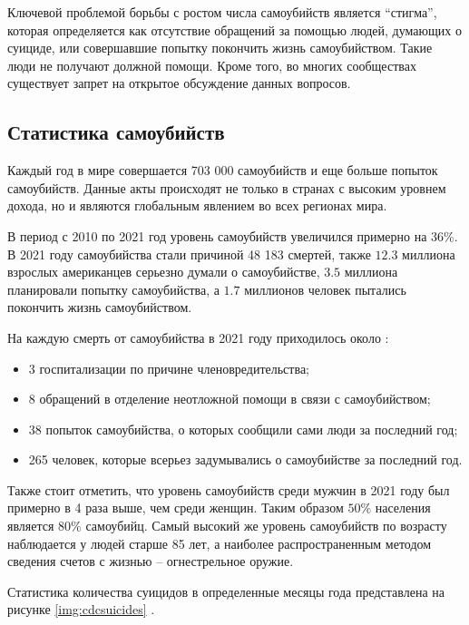 Ключевой проблемой борьбы с ростом числа самоубийств является ``стигма'', которая определяется как отсутствие обращений за помощью людей, думающих о суициде, или совершавшие попытку покончить жизнь самоубийством. Такие люди не получают должной помощи. Кроме того, во многих сообществах существует запрет на открытое обсуждение данных вопросов. \cite{suicideVOZDouble}

\subsection{Статистика самоубийств}
Каждый год в мире совершается 703 000 самоубийств и еще больше попыток самоубийств. Данные акты происходят не только в странах с высоким уровнем дохода, но и являются глобальным явлением во всех регионах мира. \cite{suicideVOZDouble}

В период с 2010 по 2021 год уровень самоубийств увеличился примерно на $36\%$. В 2021 году самоубийства стали причиной 48 183 смертей, также $12.3$ миллиона взрослых американцев серьезно думали о самоубийстве, $3.5$ миллиона планировали попытку самоубийства, а $1.7$ миллионов человек пытались покончить жизнь самоубийством. \cite{suicideStats}

На каждую смерть от самоубийства в 2021 году приходилось около \cite{suicideStats}:
\begin{itemize}
	\item 3 госпитализации по причине членовредительства;
	\item 8 обращений в отделение неотложной помощи в связи с самоубийством;
	\item 38 попыток самоубийства, о которых сообщили сами люди за последний год;
	\item 265 человек, которые всерьез задумывались о самоубийстве за последний год. 
\end{itemize}

Также стоит отметить, что уровень самоубийств среди мужчин в 2021 году был примерно в 4 раза выше, чем среди женщин. Таким образом $50\%$ населения является $80\%$ самоубийц. Самый высокий же уровень самоубийств по возрасту наблюдается у людей старше 85 лет, а наиболее распространенным методом сведения счетов с жизнью -- огнестрельное оружие.

Статистика количества суицидов в определенные месяцы года представлена на рисунке \ref{img:cdcsuicides} \cite{suicideStats}.

